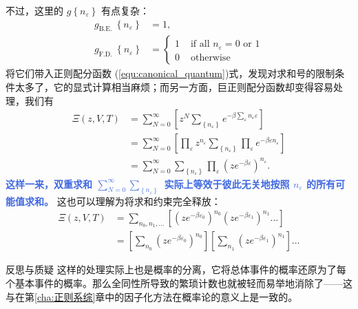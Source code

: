 不过，这里的 $g\left\{n_{\varepsilon}\right\}$ 有点复杂：
\begin{align}
    g_{\text {B.E. }}\left\{n_{\varepsilon}\right\}&=1,\\
    g_{\text {F.D. }}\left\{n_{\varepsilon}\right\}&= \begin{cases}1 & \text { if all } n_{\varepsilon}=0 \text { or } 1 \\ 0 & \text { otherwise }\end{cases}
\end{align}
将它们带入正则配分函数 (\ref*{equ:canonical_quantum})式，发现对求和号的限制条件太多了，它的显式计算相当麻烦；而另一方面，巨正则配分函数却变得容易处理，我们有
\begin{equation}\label{equ:grandcar}
    \begin{aligned}
    \Xi(z, V, T) & =\sum_{N=0}^{\infty}\left[z^N \sum_{\left\{n_{\varepsilon}\right\}} e^{-\beta \sum_{\varepsilon} n_{\varepsilon} \varepsilon}\right] \\
    &= \sum_{N=0}^{\infty}\left[\prod_\varepsilon z^{n_\varepsilon} \sum_{\left\{n_{\varepsilon}\right\}} \prod_\varepsilon e^{-\beta \varepsilon n_{\varepsilon} }\right]\\
    & =\sum_{N=0}^{\infty}\sum_{\left\{n_{\varepsilon}\right\}}\prod_{\varepsilon}\left(z e^{-\beta \varepsilon}\right)^{n_{\varepsilon}} .
    \end{aligned}
\end{equation}
\textcolor{RoyalBlue}{\textbf{\kaishu 这样一来，双重求和 $\displaystyle\sum_{N=0}^{\infty}\sum_{\left\{n_{\varepsilon}\right\}}$ 实际上等效于彼此无关地按照 $n_\varepsilon$ 的所有可能值求和。}} 这也可以理解为将求和约束完全释放：
\begin{equation}
    \begin{aligned}
    \Xi(z, V, T) & =\sum_{n_0, n_1, \ldots}\left[\left(z e^{-\beta \varepsilon_0}\right)^{n_0}\left(z e^{-\beta \varepsilon_1}\right)^{n_1} \ldots\right] \\
    & =\left[\sum_{n_0}\left(z e^{-\beta \varepsilon_0}\right)^{n_0}\right]\left[\sum_{n_1}\left(z e^{-\beta \varepsilon_1}\right)^{n_1}\right] \ldots
    \end{aligned}
\end{equation}

\begin{justification}{\kaishu 反思与质疑}
\kaishu \fontsize{11pt}{16pt}
这样的处理实际上也是概率的分离，它将总体事件的概率还原为了每个基本事件的概率。那么全同性所导致的繁琐计数也就被轻而易举地消除了——这与在第\ref*{cha:正则系综}章中的因子化方法在概率论的意义上是一致的。
\end{justification}

